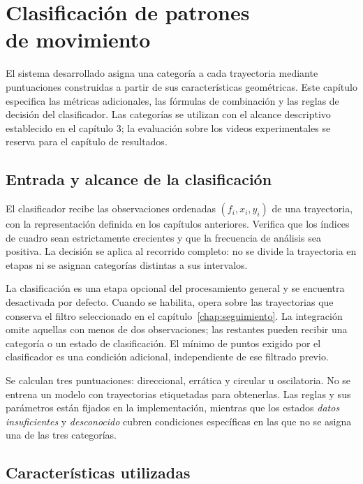 \chapter[Clasificación de patrones de movimiento]{Clasificación de patrones\\de movimiento}
\label{chap:clasificacion-movimiento}

El sistema desarrollado asigna una categoría a cada trayectoria mediante puntuaciones construidas a partir de sus características geométricas. Este capítulo especifica las métricas adicionales, las fórmulas de combinación y las reglas de decisión del clasificador. Las categorías se utilizan con el alcance descriptivo establecido en el capítulo 3; la evaluación sobre los videos experimentales se reserva para el capítulo de resultados.

\section{Entrada y alcance de la clasificación}

El clasificador recibe las observaciones ordenadas $(f_i,x_i,y_i)$ de una trayectoria, con la representación definida en los capítulos anteriores. Verifica que los índices de cuadro sean estrictamente crecientes y que la frecuencia de análisis sea positiva. La decisión se aplica al recorrido completo: no se divide la trayectoria en etapas ni se asignan categorías distintas a sus intervalos.

La clasificación es una etapa opcional del procesamiento general y se encuentra desactivada por defecto. Cuando se habilita, opera sobre las trayectorias que conserva el filtro seleccionado en el capítulo~\ref{chap:seguimiento}. La integración omite aquellas con menos de dos observaciones; las restantes pueden recibir una categoría o un estado de clasificación. El mínimo de puntos exigido por el clasificador es una condición adicional, independiente de ese filtrado previo.

Se calculan tres puntuaciones: direccional, errática y circular u oscilatoria. No se entrena un modelo con trayectorias etiquetadas para obtenerlas. Las reglas y sus parámetros están fijados en la implementación, mientras que los estados \textit{datos insuficientes} y \textit{desconocido} cubren condiciones específicas en las que no se asigna una de las tres categorías.

\section{Características utilizadas}

